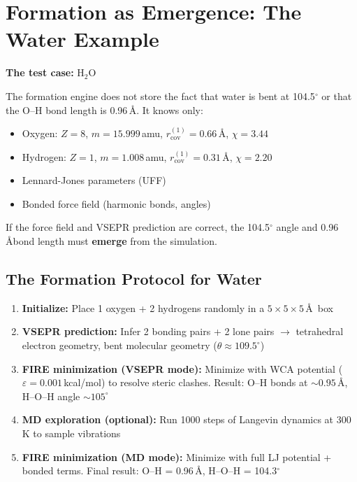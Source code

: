 \documentclass[11pt]{article}
\begin{document}
\section{Formation as Emergence: The Water Example}

\textbf{The test case:} H$_2$O

The formation engine does not store the fact that water is bent at 104.5$^\circ$ or that the O--H bond length is 0.96\,\AA. It knows only:
\begin{itemize}
\item Oxygen: $Z = 8$, $m = 15.999$\,amu, $r_{\text{cov}}^{(1)} = 0.66$\,\AA, $\chi = 3.44$
\item Hydrogen: $Z = 1$, $m = 1.008$\,amu, $r_{\text{cov}}^{(1)} = 0.31$\,\AA, $\chi = 2.20$
\item Lennard-Jones parameters (UFF)
\item Bonded force field (harmonic bonds, angles)
\end{itemize}

If the force field and VSEPR prediction are correct, the 104.5$^\circ$ angle and 0.96\,\AA bond length must \textbf{emerge} from the simulation.

\subsection{The Formation Protocol for Water}

\begin{enumerate}
\item \textbf{Initialize:} Place 1 oxygen + 2 hydrogens randomly in a $5 \times 5 \times 5$\,\AA\ box

\item \textbf{VSEPR prediction:} Infer 2 bonding pairs + 2 lone pairs $\to$ tetrahedral electron geometry, bent molecular geometry ($\theta \approx 109.5^\circ$)

\item \textbf{FIRE minimization (VSEPR mode):} Minimize with WCA potential ($\varepsilon = 0.001$\,kcal/mol) to resolve steric clashes. Result: O--H bonds at $\sim 0.95$\,\AA, H--O--H angle $\sim 105^\circ$

\item \textbf{MD exploration (optional):} Run 1000 steps of Langevin dynamics at 300\,K to sample vibrations

\item \textbf{FIRE minimization (MD mode):} Minimize with full LJ potential + bonded terms. Final result: O--H = 0.96\,\AA, H--O--H = 104.3$^\circ$
\end{enumerate}
\end{document}
